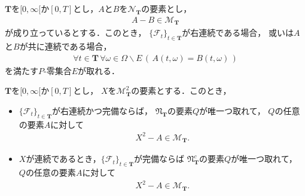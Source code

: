 	\begin{screen}
		\begin{thm}[連続な増大過程はナチュラル]
		\end{thm}
	\end{screen}
	
	\begin{screen}
		\begin{thm}[有界変動なマルチンゲールは殆ど全てのパスが定値]
		\label{thm:martingale_with_bounded_variation_is_constant}
			$\mathbf{T}$を$[0,\infty[$か$[0,T]$とし，$A$と$B$を$\mathscr{N}_{\mathbf{T}}$の要素とし，
			\begin{align}
				A - B \in \mathscr{M}_{\mathbf{T}}
			\end{align}
			が成り立っているとする．このとき，
			$\{\mathscr{F}_t\}_{t \in \mathbf{T}}$が右連続である場合，
			或いは$A$と$B$が共に連続である場合，
			\begin{align}
				\forall t \in \mathbf{T}\, \forall \omega \in \Omega \backslash E\,
				\left(\, A(t,\omega) = B(t,\omega)\, \right)
			\end{align}
			を満たす$P$-零集合$E$が取れる．
		\end{thm}
	\end{screen}
	
	\begin{sketch}\mbox{}
		\begin{description}
			\item[]
		\end{description}
	\end{sketch}
	
	\begin{screen}
		\begin{thm}[二乗可積分マルチンゲールは増大過程とマルチンゲールに分解できる]
		\label{thm:decomposition_of_square_integrable_martingales}
			$\mathbf{T}$を$[0,\infty[$か$[0,T]$とし，
			$X$を$\mathscr{M}^2_{\mathbf{T}}$の要素とする．このとき，
			\begin{itemize}
				\item $\{\mathscr{F}_t\}_{t \in \mathbf{T}}$が右連続かつ完備ならば，
					$\mathfrak{N}_{\mathbf{T}}$の要素$Q$が唯一つ取れて，
					$Q$の任意の要素$A$に対して
					\begin{align}
						X^2 - A \in \mathscr{M}_{\mathbf{T}}.
					\end{align}
					
				\item $X$が連続であるとき，$\{\mathscr{F}_t\}_{t \in \mathbf{T}}$が完備ならば
					$\mathfrak{N}^c_{\mathbf{T}}$の要素$Q$が唯一つ取れて，
					$Q$の任意の要素$A$に対して
					\begin{align}
						X^2 - A \in \mathscr{M}_{\mathbf{T}}.
					\end{align}
			\end{itemize}
		\end{thm}
	\end{screen}
	
